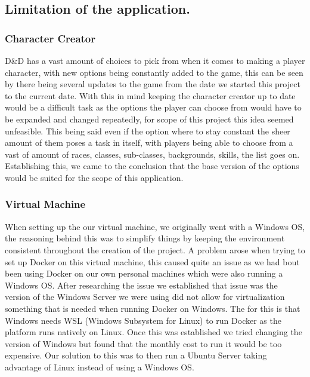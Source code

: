 \subsection{Limitation of the application.}
\subsubsection{Character Creator}
D\&D has a vast amount of choices to pick from when it comes to making a player character, with new options being constantly added to the game, this can be seen by there being several updates to the game from the date we started this project to the current date.  With this in mind keeping the character creator up to date would be a difficult task as the options the player can choose from would have to be expanded and changed repeatedly, for scope of this project this idea seemed unfeasible.  This being said even if the option where to stay constant the sheer amount of them poses a task in itself, with players being able to choose from a vast of amount of races, classes, sub-classes, backgrounds, skills, the list goes on.  Establishing this, we came to the conclusion that the base version of the options would be suited for the scope of this application.

\subsubsection{Virtual Machine}
When setting up the our virtual machine, we originally went with a Windows OS, the reasoning behind this was to simplify things by keeping the environment consistent throughout the creation of the project.  A problem arose when trying to set up Docker on this virtual machine, this caused quite an issue as we had bout been using Docker on our own personal machines which were also running a Windows OS.  After researching the issue we established that issue was the version of the Windows Server we were using did not allow for virtualization something that is needed when running Docker on Windows.  The for this is that Windows needs WSL (Windows Subsystem for Linux) to run Docker as the platform runs natively on Linux.  Once this was established we tried changing the version of Windows but found that the monthly cost to run it would be too expensive.  Our solution to this was to then run a Ubuntu Server taking advantage of Linux instead of using a Windows OS.

